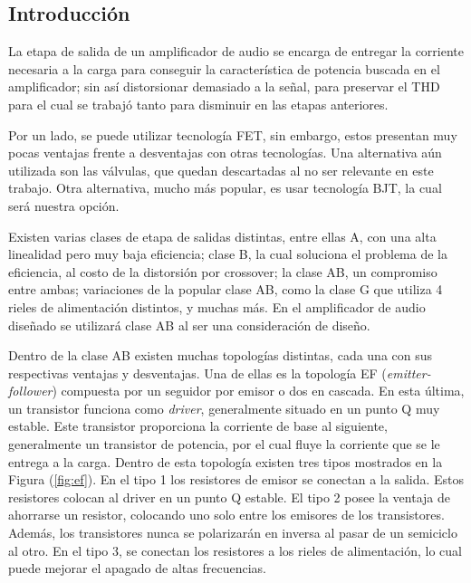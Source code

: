 
\subsection{Introducción}

La etapa de salida de un amplificador de audio se encarga de entregar la corriente necesaria a la carga para conseguir la característica de potencia buscada en el amplificador; sin así distorsionar demasiado a la señal, para preservar el THD para el cual se trabajó tanto para disminuir en las etapas anteriores.

Por un lado, se puede utilizar tecnología FET, sin embargo, estos presentan muy pocas ventajas frente a desventajas con otras tecnologías. Una alternativa aún utilizada son las válvulas, que quedan descartadas al no ser relevante en este trabajo. Otra alternativa, mucho más popular, es usar tecnología BJT, la cual será nuestra opción. 

Existen varias clases de etapa de salidas distintas, entre ellas A, con una alta linealidad pero muy baja eficiencia; clase B, la cual soluciona el problema de la eficiencia, al costo de la distorsión por crossover; la clase AB, un compromiso entre ambas; variaciones de la popular clase AB, como la clase G que utiliza 4 rieles de alimentación distintos, y muchas más.
En el amplificador de audio diseñado se utilizará clase AB al ser una consideración de diseño.

Dentro de la clase AB existen muchas topologías distintas, cada una con sus respectivas ventajas y desventajas. Una de ellas es la topología EF (\textit{emitter-follower}) compuesta por un seguidor por emisor o dos en cascada. En esta última, un transistor funciona como \textit{driver}, generalmente situado en un punto Q muy estable. Este transistor proporciona la corriente de base al siguiente, generalmente un transistor de potencia, por el cual fluye la corriente que se le entrega a la carga. Dentro de esta topología existen tres tipos mostrados en la Figura (\ref{fig:ef}). En el tipo 1 los resistores de emisor se conectan a la salida. Estos resistores colocan al driver en un punto Q estable. El tipo 2 posee la ventaja de ahorrarse un resistor, colocando uno solo entre los emisores de los transistores. Además, los transistores nunca se polarizarán en inversa al pasar de un semiciclo al otro. En el tipo 3, se conectan los resistores a los rieles de alimentación, lo cual puede mejorar el apagado de altas frecuencias.

